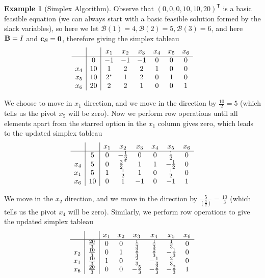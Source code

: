 \documentclass[11pt]{article}
\theoremstyle{definition}
\newtheorem{example}[theorem]{Example}
\theoremstyle{remark}
\newcommand{\pqty}[1]{\left(#1\right)}
\newcommand{\flatfrac}[2]{\frac{#1}{#2}}
\newcommand{\transpose}{^{\mathsf{T}}}
\newcommand{\identityM}{I}
\begin{document}
\begin{example}[Simplex Algorithm]
    Observe that \(\pqty{0, 0, 0, 10, 10, 20}\transpose\) is a basic feasible equation (we can always start with a basic feasible solution formed by the slack variables), so here we let \(\mathcal{B}\pqty{1} = 4, \mathcal{B}\pqty{2} = 5, \mathcal{B}\pqty{3} = 6\), and here \(\vb{B} = \identityM\) and \(\vb{c}_{\mathcal{B}} = \vb{0}\), therefore giving the simplex tableau
    \[
        \begin{array}{c|c|cccccc}
            &    & x_1 & x_2 & x_3 & x_4 & x_5 & x_6 \\
        \hline
            & 0  & -1 & -1 & -1 & 0 & 0 & 0 \\
        x_4 & 10 & 1 & 2 & 2 & 1 & 0 & 0 \\
        x_5 & 10 & 2^{\ast} & 1 & 2 & 0 & 1 & 0 \\
        x_6 & 20 & 2 & 2 & 1 & 0 & 0 & 1 \\
        \end{array}
    \]

    We choose to move in \(x_1\) direction, and we move in the direction by \(\flatfrac{10}{2} = 5\) (which tells us the pivot \(x_5\) will be zero). Now we perform row operations until all elements apart from the starred option in the \(x_1\) column gives zero, which leads to the updated simplex tableau
    \[
        \begin{array}{c|c|cccccc}
            &   & x_1 & x_2 & x_3 & x_4 & x_5 & x_6 \\
        \hline
            & 5 & 0 & -\flatfrac{1}{2} & 0 & 0 & \flatfrac{1}{2} & 0 \\
        x_4 & 5 & 0 & \flatfrac{3}{2}^{\ast} & 1 & 1 & -\flatfrac{1}{2} & 0 \\
        x_1 & 5 & 1 & \flatfrac{1}{2} & 1 & 0 & \flatfrac{1}{2} & 0 \\
        x_6 & 10 & 0 & 1 & -1 & 0 & -1 & 1 \\
        \end{array}
    \]

    We move in the \(x_2\) direction, and we move in the direction by \(\flatfrac{5}{\pqty{\flatfrac{3}{2}}} = \flatfrac{10}{3}\) (which tells us the pivot \(x_4\) will be zero). Similarly, we perform row operations to give the updated simplex tableau
    \[
        \begin{array}{c|c|cccccc}
            &   & x_1 & x_2 & x_3 & x_4 & x_5 & x_6 \\
        \hline
            & \flatfrac{20}{3} & 0 & 0 & \flatfrac{1}{3} & \flatfrac{1}{3} & \flatfrac{1}{3} & 0 \\
        x_2 & \flatfrac{10}{3} & 0 & 1 & \flatfrac{2}{3} & \flatfrac{2}{3} & -\flatfrac{1}{3} & 0 \\
        x_1 & \flatfrac{10}{3} & 1 & 0 & \flatfrac{2}{3} & -\flatfrac{1}{3} & \flatfrac{2}{3} & 0 \\
        x_6 & \flatfrac{20}{3} & 0 & 0 & -\flatfrac{5}{3} & -\flatfrac{2}{3} & -\flatfrac{2}{3} & 1 \\
        \end{array}
    \]


\end{example}
\end{document}

